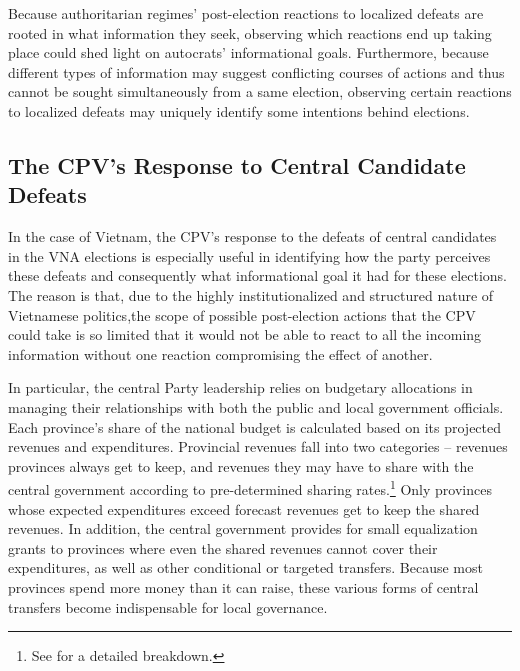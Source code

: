 \documentclass[12pt]{article}
\newcommand\fnote[1]{\footnote{\baselineskip=2\normalbaselineskip#1}}
\newcommand{\1}{\mathbbm{1}}
\begin{document}
Because authoritarian regimes' post-election reactions to localized defeats are rooted in what information they seek, observing which reactions end up taking place could shed light on autocrats' informational goals. Furthermore, because different types of information may suggest conflicting courses of actions and thus cannot be sought simultaneously from a same election, observing certain reactions to localized defeats may uniquely identify some intentions behind elections. 



\subsection{The CPV's Response to Central Candidate Defeats}
\label{sec:vietnam_local_defeat}

In the case of Vietnam, the CPV's response to the defeats of central candidates in the VNA elections is especially useful in identifying how the party perceives these defeats and consequently what informational goal it had for these elections. The reason is that, due to the highly institutionalized and structured nature of Vietnamese politics,the scope of possible post-election actions that the CPV could take is so limited that it would not be able to react to all the incoming information without one reaction compromising the effect of another.

In particular, the central Party leadership relies on budgetary allocations in managing their relationships with both the public and local government officials. Each province's share of the national budget is calculated based on its projected revenues and expenditures. Provincial revenues fall into two categories -- revenues provinces always get to keep, and revenues they may have to share with the central government according to pre-determined sharing rates.\fnote{See \citet{MartinezVazquez2004} for a detailed breakdown.} Only provinces whose expected expenditures exceed forecast revenues get to keep the shared revenues. In addition, the central government provides for small equalization grants to provinces where even the shared revenues cannot cover their expenditures, as well as other conditional or targeted transfers. Because most provinces spend more money than it can raise, these various forms of central transfers become indispensable for local governance.
\end{document}
